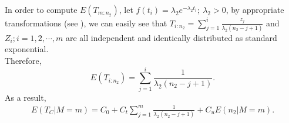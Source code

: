 \documentclass[twoside]{article}
\begin{document}
In order to compute $E(T_{m:n_2})$, let $f(t_i)=\lambda_2 e^{-\lambda_2 t_i};\ \lambda_2>0$, by appropriate transformations (see \cite{DavidNagaraja2003}), 
we can easily see that $T_{i:n_2}=\sum_{j=1}^{i} \frac{z_j}{\lambda_2\left(n_2-j+1\right)} $ and $Z_i; i=1,2,\cdots,m$ are all independent and identically distributed as standard exponential. \\Therefore,
$$ E(T_{i:n_2})=\sum_{j=1}^{i}\frac{1}{\lambda_2\left(n_2-j+1\right)}.$$ As a result,  
\begin{eqnarray}\label{M9}\nonumber 
  E(T_C|M=m)=C_0+C_t\sum_{j=1}^{m}\frac{1}{ \lambda_2\left(n_2-j+1\right)}+C_uE(n_2|M=m).\\
\end{eqnarray}
\end{document}
